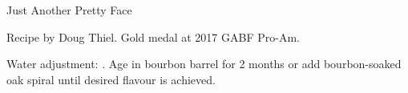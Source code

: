\begin{recipe}{Just Another Pretty Face}

\begin{aboutblock}
Recipe by Doug Thiel. Gold medal at 2017 GABF Pro-Am.
\end{aboutblock}


\begin{methodandtiming}

\begin{mashsteps}
\end{mashsteps}

\begin{fermentationsteps}
\end{fermentationsteps}

\begin{directions}
Water adjustment: . Age in bourbon barrel for 2 months
or add bourbon-soaked oak spiral until desired flavour is achieved.
\end{directions}

\end{methodandtiming}

\recipebreak

\begin{ingredientsblock}

\begin{malts}
\end{malts}

\begin{hops}
\end{hops}


\end{ingredientsblock}

\end{recipe}
